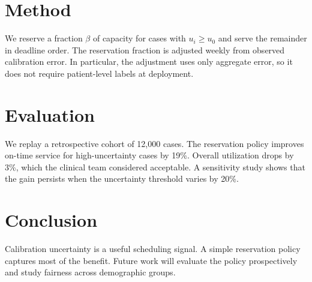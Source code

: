 \documentclass[conference]{IEEEtran}
\begin{document}
\section{Method}
\label{sec:method}
We reserve a fraction $\beta$ of capacity for cases with $u_i \ge u_0$ and serve the remainder in deadline order.
The reservation fraction is adjusted weekly from observed calibration error.
In particular, the adjustment uses only aggregate error, so it does not require patient-level labels at deployment.

\section{Evaluation}
\label{sec:eval}
We replay a retrospective cohort of 12{,}000 cases.
The reservation policy improves on-time service for high-uncertainty cases by 19\%.
Overall utilization drops by 3\%, which the clinical team considered acceptable.
A sensitivity study shows that the gain persists when the uncertainty threshold varies by 20\%.

\section{Conclusion}
\label{sec:conclusion}
Calibration uncertainty is a useful scheduling signal.
A simple reservation policy captures most of the benefit.
Future work will evaluate the policy prospectively and study fairness across demographic groups.
\end{document}
